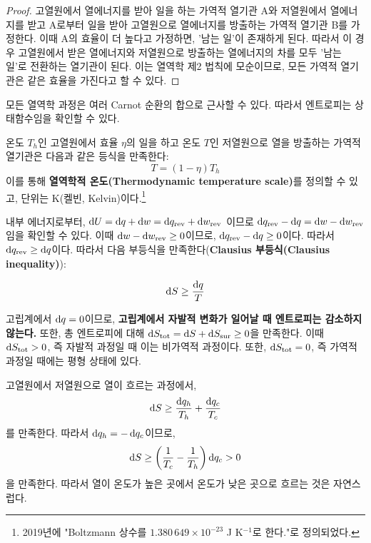         \begin{proof}
        고열원에서 열에너지를 받아 일을 하는 가역적 열기관 A와 
        저열원에서 열에너지를 받고 A로부터 일을 받아 고열원으로 열에너지를 방출하는 가역적 열기관 B를 가정한다. 이때 A의 효율이 더 높다고 가정하면, '남는 일'이 존재하게 
        된다. 따라서 이 경우 고열원에서 받은 열에너지와 저열원으로 방출하는 열에너지의 차를 모두 '남는 일'로 전환하는 열기관이 된다. 이는 열역학 제2 법칙에 모순이므로, 
        모든 가역적 열기관은 같은 효율을 가진다고 할 수 있다.
        \end{proof}
        \par 모든 열역학 과정은 여러 Carnot 순환의 합으로 근사할 수 있다. 따라서 엔트로피는 상태함수임을 확인할 수 있다.
        \par 온도 $T_h$인 고열원에서 효율 $\eta$의 일을 하고 온도 $T$인 저열원으로 열을 방출하는 가역적 열기관은 다음과 같은 등식을 만족한다:
        \begin{equation*}
            T = \left( 1- \eta\right)T_h
        \end{equation*}
        이를 통해 \textbf{열역학적 온도(Thermodynamic temperature scale)}를 정의할 수 있고, 단위는 K(켈빈, Kelvin)이다.\footnote[11]{%
        2019년에 "Boltzmann 상수를 $1.380\,649 \times 10^{-23}$ J K$^{-1}$로 한다."로 정의되었다.}
        \par 내부 에너지로부터, $\operatorname{d\!} U = \operatorname{d\!} q + \operatorname{d\!} w = \operatorname{d\!} q_\mathrm{rev} + \operatorname{d\!} w_\mathrm{rev}$ 이므로 
        $\operatorname{d\!} q_\mathrm{rev} - \operatorname{d\!} q = \operatorname{d\!} w - \operatorname{d\!} w_\mathrm{rev}$임을 확인할 수 있다. 이때 
        $\operatorname{d\!} w - \operatorname{d\!} w_\mathrm{rev} \geq 0$이므로, $\operatorname{d\!} q_\mathrm{rev} - \operatorname{d\!} q \geq 0$이다. 따라서 
        $\displaystyle \operatorname{d\!} q_\mathrm{rev} \geq \operatorname{d\!} q$이다. 따라서 다음 부등식을 만족한다(\textbf{Clausius 부등식(Clausius inequality)}):
        \begin{law}\label{clausiusineq}
        \begin{equation*}
            \operatorname{d\!} S \geq \frac{\operatorname{d\!} q}{T}
        \end{equation*}
        \end{law}
        고립계에서 $\operatorname{d\!} q = 0$이므로, \textbf{고립계에서 자발적 변화가 일어날 때 엔트로피는 감소하지 않는다.} 또한, 총 엔트로피에 대해 
        $\operatorname{d\!} S_\mathrm{tot} = \operatorname{d\!} S + \operatorname{d\!} S_\mathrm{sur} \geq 0$을 만족한다. 이때 $\operatorname{d\!} S_\mathrm{tot} > 0$, 즉 
        자발적 과정일 때 이는 비가역적 과정이다. 또한, $\operatorname{d\!} S_\mathrm{tot} = 0$, 즉 가역적 과정일 때에는 평형 상태에 있다.
        \par 고열원에서 저열원으로 열이 흐르는 과정에서,
        \begin{equation*}
            \operatorname{d\!} S \geq \frac{\operatorname{d\!} q_h}{T_h} + \frac{\operatorname{d\!} q_c}{T_c}
        \end{equation*}
        를 만족한다. 따라서 $\displaystyle\operatorname{d\!} q_h = -\operatorname{d\!} q_c$이므로,
        \begin{equation*}
            \operatorname{d\!} S \geq \left( \frac{1}{T_c} - \frac{1}{T_h} \right)\operatorname{d\!} q_c > 0
        \end{equation*}
        을 만족한다. 따라서 열이 온도가 높은 곳에서 온도가 낮은 곳으로 흐르는 것은 자연스럽다.
